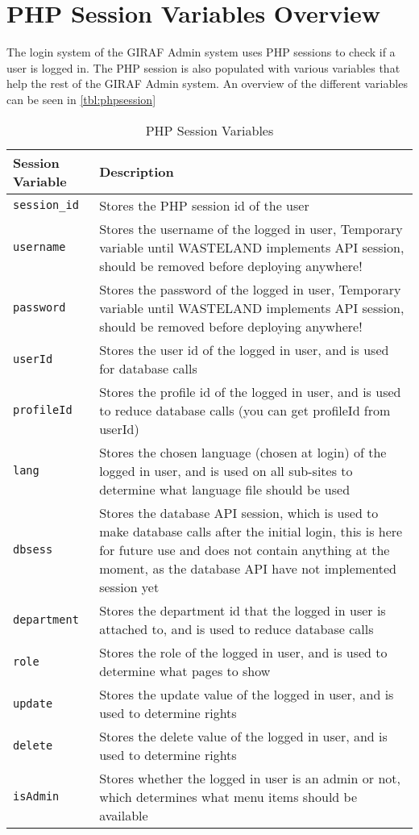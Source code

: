 \section{PHP Session Variables Overview}
\label{sec:phpSesion}
The login system of the GIRAF Admin system uses PHP sessions to check if a user is logged in. The PHP session is also populated with various variables that help the rest of the GIRAF Admin system. An overview of the different variables can be seen in \autoref{tbl:phpsession}
\begin{table}[h]
\begin{tabularx}{\linewidth}{| l | X |}
\hline
Session Variable & Description \\ \hline
\texttt{session\_id} & Stores the PHP session id of the user \\ \hline
\texttt{username} & Stores the username of the logged in user, {\color{red} Temporary variable until WASTELAND implements API session, should be removed before deploying anywhere!} \\ \hline
\texttt{password} & Stores the password of the logged in user, {\color{red} Temporary variable until WASTELAND implements API session, should be removed before deploying anywhere!} \\ \hline
\texttt{userId} & Stores the user id of the logged in user, and is used for database calls \\ \hline
\texttt{profileId} & Stores the profile id of the logged in user, and is used to reduce database calls (you can get profileId from userId) \\ \hline
\texttt{lang} & Stores the chosen language (chosen at login) of the logged in user, and is used on all sub-sites to determine what language file should be used \\ \hline
\texttt{dbsess} & Stores the database API session, which is used to make database calls after the initial login, {\color{red} this is here for future use and does not contain anything at the moment, as the database API have not implemented session yet} \\ \hline
\texttt{department} & Stores the department id that the logged in user is attached to, and is used to reduce database calls \\ \hline
\texttt{role} & Stores the role of the logged in user, and is used to determine what pages to show \\ \hline
\texttt{update} & Stores the update value of the logged in user, and is used to determine rights \\ \hline
\texttt{delete} & Stores the delete value of the logged in user, and is used to determine rights \\ \hline
\texttt{isAdmin} & Stores whether the logged in user is an admin or not, which determines what menu items should be available \\
\hline
\end{tabularx}
\caption{PHP Session Variables}
\label{tbl:phpsession}
\end{table}
